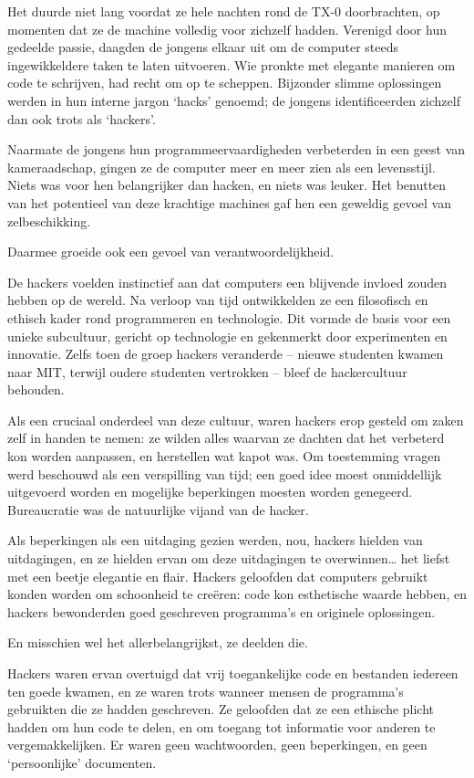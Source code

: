 \documentclass[
  a5paper,
  smalldemyvopaper,11pt,twoside,onecolumn,openright,extrafontsizes]{memoir}
\begin{document}
Het duurde niet lang voordat ze hele nachten rond de TX-0 doorbrachten,
op momenten dat ze de machine volledig voor zichzelf hadden. Verenigd
door hun gedeelde passie, daagden de jongens elkaar uit om de computer
steeds ingewikkeldere taken te laten uitvoeren. Wie pronkte met elegante
manieren om code te schrijven, had recht om op te scheppen. Bijzonder
slimme oplossingen werden in hun interne jargon `hacks' genoemd; de
jongens identificeerden zichzelf dan ook trots als `hackers'.

Naarmate de jongens hun programmeervaardigheden verbeterden in een geest
van kameraadschap, gingen ze de computer meer en meer zien als een
levensstijl. Niets was voor hen belangrijker dan hacken, en niets was
leuker. Het benutten van het potentieel van deze krachtige machines gaf
hen een geweldig gevoel van zelbeschikking.

Daarmee groeide ook een gevoel van verantwoordelijkheid.

De hackers voelden instinctief aan dat computers een blijvende invloed
zouden hebben op de wereld. Na verloop van tijd ontwikkelden ze een
filosofisch en ethisch kader rond programmeren en technologie. Dit
vormde de basis voor een unieke subcultuur, gericht op technologie en
gekenmerkt door experimenten en innovatie. Zelfs toen de groep hackers
veranderde -- nieuwe studenten kwamen naar MIT, terwijl oudere studenten
vertrokken -- bleef de hackercultuur behouden.

Als een cruciaal onderdeel van deze cultuur, waren hackers erop gesteld
om zaken zelf in handen te nemen: ze wilden alles waarvan ze dachten dat
het verbeterd kon worden aanpassen, en herstellen wat kapot was. Om
toestemming vragen werd beschouwd als een verspilling van tijd; een goed
idee moest onmiddellijk uitgevoerd worden en mogelijke beperkingen
moesten worden genegeerd. Bureaucratie was de natuurlijke vijand van de
hacker.

Als beperkingen als een uitdaging gezien werden, nou, hackers hielden
van uitdagingen, en ze hielden ervan om deze uitdagingen te
overwinnen\ldots{} het liefst met een beetje elegantie en flair. Hackers
geloofden dat computers gebruikt konden worden om schoonheid te creëren:
code kon esthetische waarde hebben, en hackers bewonderden goed
geschreven programma's en originele oplossingen.

En misschien wel het allerbelangrijkst, ze deelden die.

Hackers waren ervan overtuigd dat vrij toegankelijke code en bestanden
iedereen ten goede kwamen, en ze waren trots wanneer mensen de
programma's gebruikten die ze hadden geschreven. Ze geloofden dat ze een
ethische plicht hadden om hun code te delen, en om toegang tot
informatie voor anderen te vergemakkelijken. Er waren geen wachtwoorden,
geen beperkingen, en geen `persoonlijke' documenten.
\end{document}
